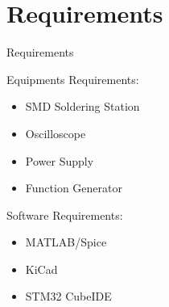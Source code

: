 \documentclass[aspectratio=169]{beamer}
\begin{document}
	
	
	
	\section{Requirements}
	\begin{frame}{Requirements}
		\begin{minipage}{0.5\textwidth}
			Equipments Requirements:
			\begin{itemize}
				
				\item SMD Soldering Station
				\item Oscilloscope
				\item Power Supply
				\item Function Generator
			\end{itemize} 
		\end{minipage}
		\begin{minipage}{0.3\textwidth}
			Software Requirements:
			\begin{itemize}
				
				\item MATLAB/Spice
				\item KiCad
				\item STM32 CubeIDE
				
			\end{itemize} 
			
		\end{minipage}
	\end{frame}
	
	
	
\end{document}
